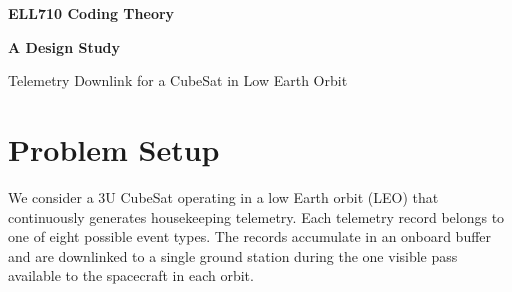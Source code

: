 \documentclass[11pt,a4paper]{article}
\begin{document}

\begin{titlepage}
    \centering

    \vspace*{2cm}

    {\Large \textbf{ELL710 Coding Theory}\par}

    \vspace{1.5cm}

    {\huge \textbf{A Design Study}\par}

    \vspace{0.5cm}

    {\LARGE Telemetry Downlink for a CubeSat in Low Earth Orbit\par}

    \vspace{2cm}


    \vfill

\end{titlepage}



\section{Problem Setup}

We consider a 3U CubeSat operating in a low Earth orbit (LEO)
that continuously generates housekeeping telemetry. Each telemetry
record belongs to one of eight possible event types. The records
accumulate in an onboard buffer and are downlinked to a single ground
station during the one visible pass available to the spacecraft in
each orbit.
\end{document}
